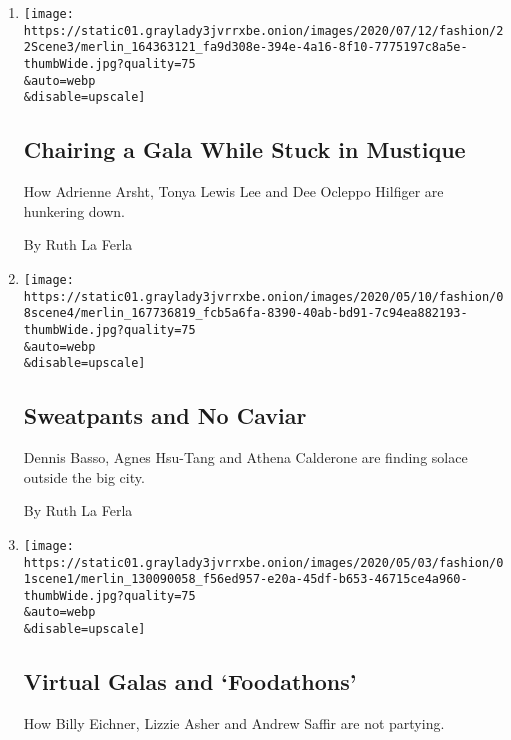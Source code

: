\begin{enumerate}
\def\labelenumi{\arabic{enumi}.}
\item
  \href{/2020/05/25/style/chairing-a-gala-while-stuck-in-mustique.html}{}

  \texttt{[image: https://static01.graylady3jvrrxbe.onion/images/2020/07/12/fashion/22Scene3/merlin\_164363121\_fa9d308e-394e-4a16-8f10-7775197c8a5e-thumbWide.jpg?quality=75\\\&auto=webp\\\&disable=upscale]}

  \hypertarget{chairing-a-gala-while-stuck-in-mustique}{%
  \subsection{Chairing a Gala While Stuck in
  Mustique}\label{chairing-a-gala-while-stuck-in-mustique}}

  How Adrienne Arsht, Tonya Lewis Lee and Dee Ocleppo Hilfiger are
  hunkering down.

  By Ruth La Ferla
\item
  \href{/2020/05/08/style/sweatpants-and-no-caviar.html}{}

  \texttt{[image: https://static01.graylady3jvrrxbe.onion/images/2020/05/10/fashion/08scene4/merlin\_167736819\_fcb5a6fa-8390-40ab-bd91-7c94ea882193-thumbWide.jpg?quality=75\\\&auto=webp\\\&disable=upscale]}

  \hypertarget{sweatpants-and-no-caviar}{%
  \subsection{Sweatpants and No Caviar}\label{sweatpants-and-no-caviar}}

  Dennis Basso, Agnes Hsu-Tang and Athena Calderone are finding solace
  outside the big city.

  By Ruth La Ferla
\item
  \href{/2020/05/01/style/virtual-galas-and-foodathons.html}{}

  \texttt{[image: https://static01.graylady3jvrrxbe.onion/images/2020/05/03/fashion/01scene1/merlin\_130090058\_f56ed957-e20a-45df-b653-46715ce4a960-thumbWide.jpg?quality=75\\\&auto=webp\\\&disable=upscale]}

  \hypertarget{virtual-galas-and-foodathons}{%
  \subsection{Virtual Galas and
  `Foodathons'}\label{virtual-galas-and-foodathons}}

  How Billy Eichner, Lizzie Asher and Andrew Saffir are not partying.


\end{enumerate}
